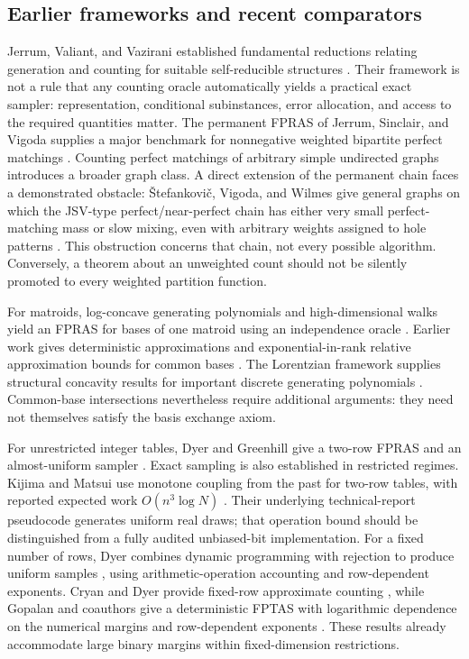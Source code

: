 \documentclass[11pt]{article}
\begin{document}
\subsection{Earlier frameworks and recent comparators}
Jerrum, Valiant, and Vazirani established fundamental reductions relating generation and counting for suitable self-reducible structures \cite{JVV1986}. Their framework is not a rule that any counting oracle automatically yields a practical exact sampler: representation, conditional subinstances, error allocation, and access to the required quantities matter. The permanent FPRAS of Jerrum, Sinclair, and Vigoda supplies a major benchmark for nonnegative weighted bipartite perfect matchings \cite{JSV2004}. Counting perfect matchings of arbitrary simple undirected graphs introduces a broader graph class. A direct extension of the permanent chain faces a demonstrated obstacle: \v{S}tefankovi\v{c}, Vigoda, and Wilmes give general graphs on which the JSV-type perfect/near-perfect chain has either very small perfect-matching mass or slow mixing, even with arbitrary weights assigned to hole patterns \cite{SVW2017}. This obstruction concerns that chain, not every possible algorithm. Conversely, a theorem about an unweighted count should not be silently promoted to every weighted partition function.

For matroids, log-concave generating polynomials and high-dimensional walks yield an FPRAS for bases of one matroid using an independence oracle \cite{ALOV2024}. Earlier work gives deterministic approximations and exponential-in-rank relative approximation bounds for common bases \cite{AOV2021}. The Lorentzian framework supplies structural concavity results for important discrete generating polynomials \cite{BH2020}. Common-base intersections nevertheless require additional arguments: they need not themselves satisfy the basis exchange axiom.

For unrestricted integer tables, Dyer and Greenhill give a two-row FPRAS and an almost-uniform sampler \cite{DG2000}. Exact sampling is also established in restricted regimes. Kijima and Matsui use monotone coupling from the past for two-row tables, with reported expected work \(O(n^3\log N)\) \cite{KM2006}. Their underlying technical-report pseudocode generates uniform real draws; that operation bound should be distinguished from a fully audited unbiased-bit implementation. For a fixed number of rows, Dyer combines dynamic programming with rejection to produce uniform samples \cite[Section~3]{Dyer2003}, using arithmetic-operation accounting and row-dependent exponents. Cryan and Dyer provide fixed-row approximate counting \cite{CD2003}, while Gopalan and coauthors give a deterministic FPTAS with logarithmic dependence on the numerical margins and row-dependent exponents \cite[Theorem~1.3]{Gopalan2011}. These results already accommodate large binary margins within fixed-dimension restrictions.
\end{document}
